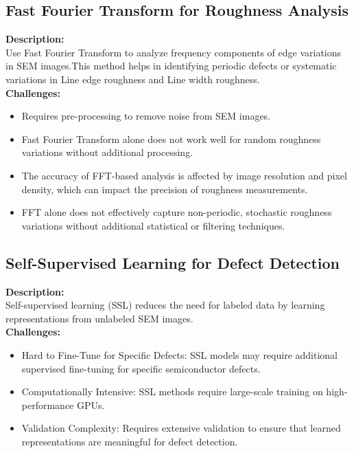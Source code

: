 \documentclass[12pt,oneside,letterpaper,english]{article}
\begin{document}
\subsection{Fast Fourier Transform for Roughness Analysis}
\textbf{Description:}\\
Use Fast Fourier Transform to analyze frequency components of edge variations in SEM images.This method helps in identifying periodic defects or systematic variations in Line edge roughness  and Line width roughness.\\

\textbf{Challenges:}
\begin{itemize}
	\item Requires pre-processing to remove noise from SEM images.
	\item Fast Fourier Transform alone does not work well for random roughness variations without additional processing.
	\item The accuracy of FFT-based analysis is affected by image resolution and pixel density, which can impact the precision of roughness measurements.
	\item FFT alone does not effectively capture non-periodic, stochastic roughness variations without additional statistical or filtering techniques.
\end{itemize}

\subsection{Self-Supervised Learning for Defect Detection}
\textbf{Description:}\\
Self-supervised learning (SSL) reduces the need for labeled data by learning representations from unlabeled SEM images.\\

\textbf{Challenges:}
\begin{itemize}
	\item Hard to Fine-Tune for Specific Defects: SSL models may require additional supervised fine-tuning for specific semiconductor defects.
	\item Computationally Intensive: SSL methods require large-scale training on high-performance GPUs.
	\item Validation Complexity: Requires extensive validation to ensure that learned representations are meaningful for defect detection.
\end{itemize}

\newpage
\setlength{\parindent}{0pt}
\end{document}
